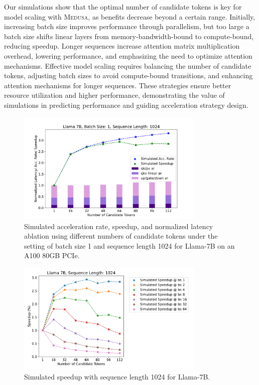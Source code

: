 \documentclass{article}
\theoremstyle{plain}
\theoremstyle{definition}
\theoremstyle{remark}
\newcommand{\ours}
{\textsc{Medusa}\xspace}
\begin{document}
Our simulations show that the optimal number of candidate tokens is key for model scaling with \ours, as benefits decrease beyond a certain range. Initially, increasing batch size improves performance through parallelism, but too large a batch size shifts linear layers from memory-bandwidth-bound to compute-bound, reducing speedup. Longer sequences increase attention matrix multiplication overhead, lowering performance, and emphasizing the need to optimize attention mechanisms. Effective model scaling requires balancing the number of candidate tokens, adjusting batch sizes to avoid compute-bound transitions, and enhancing attention mechanisms for longer sequences. These strategies ensure better resource utilization and higher performance, demonstrating the value of simulations in predicting performance and guiding acceleration strategy design.

\begin{figure}[h]
    \centering
    \includegraphics[width=0.8\textwidth]{llama7b-sim-bs1-seq1024.pdf}
    \caption{Simulated acceleration rate, speedup, and normalized latency ablation using different numbers of candidate tokens under the setting of batch size 1 and sequence length 1024 for Llama-7B on an A100 80GB PCIe.}
    \label{fig:llama7b-sim-bs1-seq1024}
\end{figure}

\begin{figure}[h]
    \centering
    \includegraphics[width=0.8\textwidth]{llama7b-sim-allbs.pdf}
    \caption{Simulated speedup with sequence length 1024 for Llama-7B.}
    \label{fig:llama7b-sim-bs1-allbs}
\end{figure}
\end{document}
